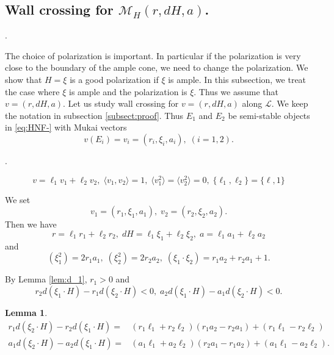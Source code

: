 \documentclass[10pt]{amsart}
\def\cal{\mathcal}
\newenvironment{NB}{
\color{red}{\bf NB}. \footnotesize 
}{}
\numberwithin{equation}{section}
\theoremstyle{plain}
\newtheorem{lem}[thm]{Lemma}
\theoremstyle{definition}
\theoremstyle{remark}
\begin{document}
\subsection{Wall crossing for ${\cal M}_H(r,dH,a)$.}\label{subsect:dH}


\begin{NB}
The choice of polarization is important.
In particular if the polarization is very close to the boundary of the ample cone,
we need to change the polarization.
We show that $H=\xi$ is a good polarization if $\xi$ is ample.
\end{NB}
In this subsection, we treat the case where $\xi$ is ample and the polarization is $\xi$.
Thus we assume that $v=(r,dH,a)$. 
Let us study wall crossing for $v=(r,dH,a)$ along ${\cal L}$.
We keep the notation in subsection \ref{subsect:proof}.
Thus $E_1$ and $E_2$ be semi-stable objects in \eqref{eq:HNF-}
with Mukai vectors
\begin{equation}
v(E_i)=v_i=(r_i,\xi_i,a_i),\;(i=1,2).
\end{equation}

\begin{NB}
\begin{equation}\label{eq:tss-cond}
v=\ell_1 v_1+\ell_2 v_2,\;\langle v_1,v_2 \rangle=1,\; \langle v_1^2 \rangle=\langle v_2^2 \rangle=0,\;
 \{\ell_1,\ell_2 \}=\{ \ell,1 \}
\end{equation}

We set
\begin{equation}
v_1=(r_1,\xi_1,a_1),\;v_2=(r_2,\xi_2,a_2).
\end{equation}
\end{NB}
Then we have
\begin{equation}\label{eq:dH1}
r=\ell_1 r_1+\ell_2 r_2,\;dH=\ell_1 \xi_1+\ell_2 \xi_2,\; a=\ell_1 a_1+\ell_2 a_2
\end{equation}
and
\begin{equation}\label{eq:dH2}
(\xi_1^2)=2r_1 a_1,\;(\xi_2^2)=2r_2 a_2,\; (\xi_1 \cdot \xi_2)=r_1 a_2+r_2 a_1+1.
\end{equation}


By Lemma \ref{lem:d_1}, $r_1>0$ and
\begin{equation}\label{eq:d1}
r_2 d(\xi_1 \cdot H)-r_1 d(\xi_2 \cdot H)<0,\;
a_2 d(\xi_1 \cdot H)-a_1 d(\xi_2 \cdot H)<0.
\end{equation}

\begin{lem}\label{lem:Z-slope}
\begin{equation}
\begin{split}
r_1 d(\xi_2 \cdot H)-r_2 d (\xi_1 \cdot H)=&
(r_1 \ell_1+r_2 \ell_2)(r_1 a_2-r_2 a_1)+(r_1 \ell_1-r_2 \ell_2)\\
a_1 d(\xi_2 \cdot H)-a_2 d (\xi_1 \cdot H)=&
(a_1 \ell_1+a_2 \ell_2)(r_2 a_1-r_1 a_2)+(a_1 \ell_1-a_2 \ell_2).
\end{split}
\end{equation}
\end{lem}
\end{document}
